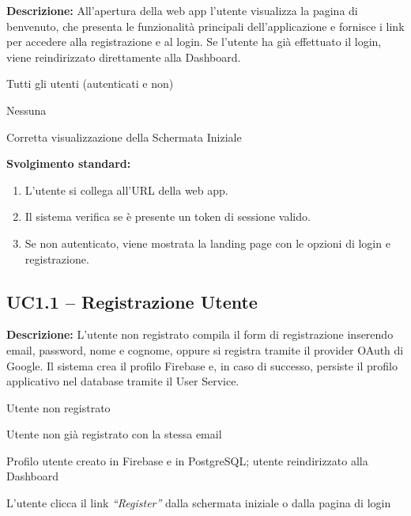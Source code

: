 \documentclass[12pt,a4paper,twoside]{report}
\newenvironment{ucbox}{%
  \begin{mdframed}[
    backgroundcolor=ucbg,
    linecolor=ucborder,
    linewidth=1pt,
    innerleftmargin=10pt,
    innerrightmargin=10pt,
    innertopmargin=8pt,
    innerbottommargin=8pt,
    roundcorner=4pt
  ]
}{%
  \end{mdframed}
}
\begin{document}
\begin{ucbox}
\textbf{Descrizione:} All'apertura della web app l'utente visualizza la pagina di benvenuto, che presenta le funzionalità principali dell'applicazione e fornisce i link per accedere alla registrazione e al login. Se l'utente ha già effettuato il login, viene reindirizzato direttamente alla Dashboard.

\begin{description}[leftmargin=4cm, style=sameline]
  \item[Attori Coinvolti:] Tutti gli utenti (autenticati e non)
  \item[Precondizione:] Nessuna
  \item[Postcondizione:] Corretta visualizzazione della Schermata Iniziale
\end{description}
\end{ucbox}

\textbf{Svolgimento standard:}
\begin{enumerate}
  \item L'utente si collega all'URL della web app.
  \item Il sistema verifica se è presente un token di sessione valido.
  \item Se non autenticato, viene mostrata la landing page con le opzioni di login e registrazione.
\end{enumerate}

\newpage
\subsection{UC1.1 -- Registrazione Utente}

\begin{ucbox}
\textbf{Descrizione:} L'utente non registrato compila il form di registrazione inserendo email, password, nome e cognome, oppure si registra tramite il provider OAuth di Google. Il sistema crea il profilo Firebase e, in caso di successo, persiste il profilo applicativo nel database tramite il User Service.

\begin{description}[leftmargin=4cm, style=sameline]
  \item[Attori Coinvolti:] Utente non registrato
  \item[Precondizione:] Utente non già registrato con la stessa email
  \item[Postcondizione:] Profilo utente creato in Firebase e in PostgreSQL; utente reindirizzato alla Dashboard
  \item[Trigger:] L'utente clicca il link \textit{``Register''} dalla schermata iniziale o dalla pagina di login
\end{description}
\end{ucbox}
\end{document}
